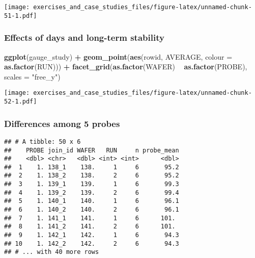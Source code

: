 \documentclass[]{book}
\newenvironment{Shaded}{\begin{snugshade}}{\end{snugshade}}
\newcommand{\DataTypeTok}[1]{\textcolor[rgb]{0.13,0.29,0.53}{#1}}
\newcommand{\KeywordTok}[1]{\textcolor[rgb]{0.13,0.29,0.53}{\textbf{#1}}}
\newcommand{\NormalTok}[1]{#1}
\newcommand{\OperatorTok}[1]{\textcolor[rgb]{0.81,0.36,0.00}{\textbf{#1}}}
\newcommand{\OtherTok}[1]{\textcolor[rgb]{0.56,0.35,0.01}{#1}}
\newcommand{\StringTok}[1]{\textcolor[rgb]{0.31,0.60,0.02}{#1}}
\theoremstyle{definition}
\theoremstyle{definition}
\theoremstyle{definition}
\theoremstyle{remark}
\begin{document}
\texttt{[image: exercises\_and\_case\_studies\_files/figure-latex/unnamed-chunk-51-1.pdf]}

\hypertarget{effects-of-days-and-long-term-stability}{%
\subsubsection{Effects of days and long-term
stability}\label{effects-of-days-and-long-term-stability}}

\begin{Shaded}
\begin{Highlighting}[]
\KeywordTok{ggplot}\NormalTok{(gauge_study) }\OperatorTok{+}
\StringTok{  }\KeywordTok{geom_point}\NormalTok{(}\KeywordTok{aes}\NormalTok{(rowid, AVERAGE, }\DataTypeTok{colour =} \KeywordTok{as.factor}\NormalTok{(RUN))) }\OperatorTok{+}
\StringTok{  }\KeywordTok{facet_grid}\NormalTok{(}\KeywordTok{as.factor}\NormalTok{(WAFER) }\OperatorTok{~}\StringTok{ }\KeywordTok{as.factor}\NormalTok{(PROBE), }\DataTypeTok{scales =} \StringTok{"free_y"}\NormalTok{)}
\end{Highlighting}
\end{Shaded}

\texttt{[image: exercises\_and\_case\_studies\_files/figure-latex/unnamed-chunk-52-1.pdf]}

\hypertarget{differences-among-5-probes}{%
\subsubsection{Differences among 5
probes}\label{differences-among-5-probes}}

\begin{Shaded}
\end{Shaded}

\begin{verbatim}
## # A tibble: 50 x 6
##    PROBE join_id WAFER   RUN     n probe_mean
##    <dbl> <chr>   <dbl> <int> <int>      <dbl>
##  1    1. 138_1    138.     1     6       95.2
##  2    1. 138_2    138.     2     6       95.2
##  3    1. 139_1    139.     1     6       99.3
##  4    1. 139_2    139.     2     6       99.4
##  5    1. 140_1    140.     1     6       96.1
##  6    1. 140_2    140.     2     6       96.1
##  7    1. 141_1    141.     1     6      101. 
##  8    1. 141_2    141.     2     6      101. 
##  9    1. 142_1    142.     1     6       94.3
## 10    1. 142_2    142.     2     6       94.3
## # ... with 40 more rows
\end{verbatim}
\end{document}
